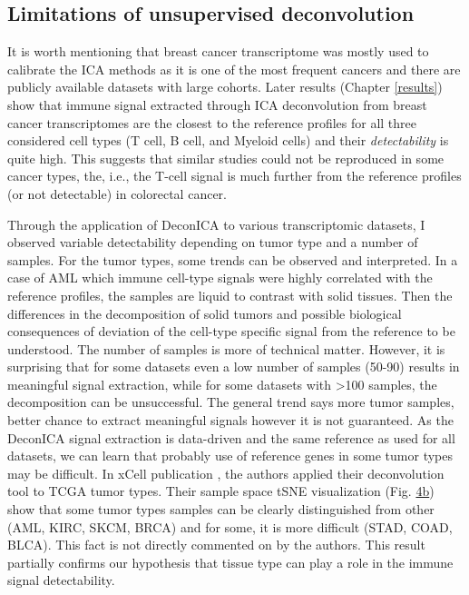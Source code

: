 \documentclass[12pt,]{book}
\theoremstyle{definition}
\theoremstyle{definition}
\theoremstyle{definition}
\theoremstyle{remark}
\begin{document}
\hypertarget{limitations-of-unsupervised-deconvolution}{%
\subsection{Limitations of unsupervised
deconvolution}\label{limitations-of-unsupervised-deconvolution}}

It is worth mentioning that breast cancer transcriptome was mostly used
to calibrate the ICA methods as it is one of the most frequent cancers
and there are publicly available datasets with large cohorts. Later
results (Chapter \ref{results}) show that immune signal extracted
through ICA deconvolution from breast cancer transcriptomes are the
closest to the reference profiles for all three considered cell types (T
cell, B cell, and Myeloid cells) and their \emph{detectability} is quite
high. This suggests that similar studies could not be reproduced in some
cancer types, the, i.e., the T-cell signal is much further from the
reference profiles (or not detectable) in colorectal cancer.

Through the application of DeconICA to various transcriptomic datasets,
I observed variable detectability depending on tumor type and a number
of samples. For the tumor types, some trends can be observed and
interpreted. In a case of AML which immune cell-type signals were highly
correlated with the reference profiles, the samples are liquid to
contrast with solid tissues. Then the differences in the decomposition
of solid tumors and possible biological consequences of deviation of the
cell-type specific signal from the reference to be understood. The
number of samples is more of technical matter. However, it is surprising
that for some datasets even a low number of samples (50-90) results in
meaningful signal extraction, while for some datasets with
\textgreater{}100 samples, the decomposition can be unsuccessful. The
general trend says more tumor samples, better chance to extract
meaningful signals however it is not guaranteed. As the DeconICA signal
extraction is data-driven and the same reference as used for all
datasets, we can learn that probably use of reference genes in some
tumor types may be difficult. In xCell publication \citep{Aran2017}, the
authors applied their deconvolution tool to TCGA tumor types. Their
sample space tSNE visualization (Fig.
\href{https://media.springernature.com/full/springer-static/image/art\%3A10.1186\%2Fs13059-017-1349-1/MediaObjects/13059_2017_1349_Fig4_HTML.gif}{4b})
show that some tumor types samples can be clearly distinguished from
other (AML, KIRC, SKCM, BRCA) and for some, it is more difficult (STAD,
COAD, BLCA). This fact is not directly commented on by the authors. This
result partially confirms our hypothesis that tissue type can play a
role in the immune signal detectability.
\end{document}
